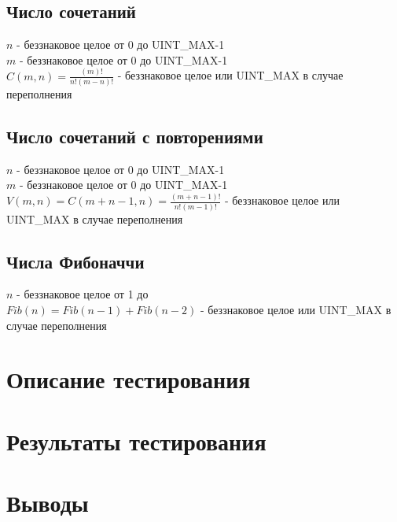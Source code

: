 \documentclass[zuev-report.tex]{subfiles}
\begin{document}
\subsection{Число сочетаний}
\txtIn
$n$ - беззнаковое целое от 0 до UINT\_MAX-1\\
$m$ - беззнаковое целое от 0 до UINT\_MAX-1\\
\txtOut
$C(m,n)=\frac{(m)!}{n!(m−n)!}$ - беззнаковое целое или UINT\_MAX в случае переполнения\\
\txtTxt
\label{binomial}

\subsection{Число сочетаний с повторениями}
\txtIn
$n$ - беззнаковое целое от 0 до UINT\_MAX-1\\
$m$ - беззнаковое целое от 0 до UINT\_MAX-1\\
\txtOut
$V(m,n)=C(m+n−1,n)=\frac{(m+n−1)!}{n!(m−1)!}$ - беззнаковое целое или UINT\_MAX в случае переполнения\\
\txtTxt
\label{vmn}

\subsection{Числа Фибоначчи}
\txtIn
$n$ - беззнаковое целое от 1 до \\ %
\txtOut
$Fib(n)=Fib(n-1)+Fib(n-2)$ - беззнаковое целое или UINT\_MAX в случае переполнения\\
\txtTxt
\label{vmn}

\section{Описание тестирования}
\section{Результаты тестирования}
\section{Выводы}
\end{document}
